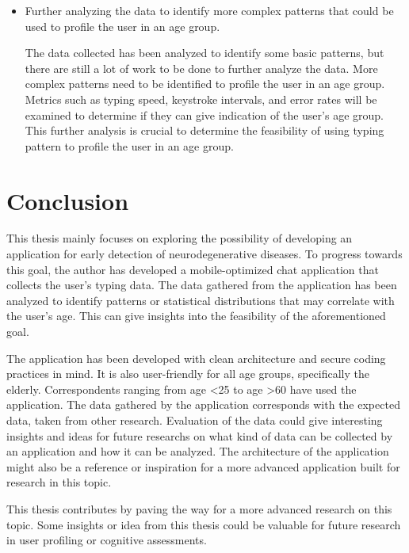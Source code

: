 \begin{itemize}
    \item Further analyzing the data to identify more complex patterns that could be used to profile the user in an age group.
    
    The data collected has been analyzed to identify some basic patterns, but there are still a lot of work to be done to further analyze the data.
    More complex patterns need to be identified to profile the user in an age group.
    Metrics such as typing speed, keystroke intervals, and error rates will be examined to determine if they can give indication of the user's age group.
    This further analysis is crucial to determine the feasibility of using typing pattern to profile the user in an age group.
    
\end{itemize}

\section{Conclusion}


This thesis mainly focuses on exploring the possibility of developing an application for early detection of neurodegenerative diseases.
To progress towards this goal, the author has developed a mobile-optimized chat application that collects the user's typing data.
The data gathered from the application has been analyzed to identify patterns or statistical distributions that may correlate with the user's age.
This can give insights into the feasibility of the aforementioned goal.

The application has been developed with clean architecture and secure coding practices in mind.
It is also user-friendly for all age groups, specifically the elderly.
Correspondents ranging from age \textless 25 to age \textgreater 60 have used the application.
The data gathered by the application corresponds with the expected data, taken from other research.
Evaluation of the data could give interesting insights and ideas for future researchs on what kind of data can be collected by an application and how it can be analyzed.
The architecture of the application might also be a reference or inspiration for a more advanced application built for research in this topic.

This thesis contributes by paving the way for a more advanced research on this topic.
Some insights or idea from this thesis could be valuable for future research in user profiling or cognitive assessments.

